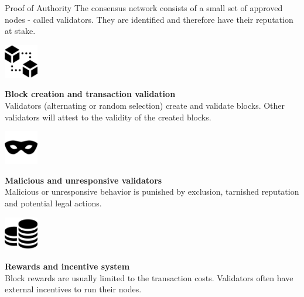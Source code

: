 \documentclass[]{beamer}
\begin{document}
	\begin{frame}{Proof of Authority}
		\small
		The consensus network consists of a \color{focus}small set of approved nodes \color{black} - called validators. They are identified and therefore have their reputation at stake.
		
		\pause
		\vspace{1.5 em}
		\begin{minipage}{0.2\textwidth}
			\begin{center}
				\includegraphics[height=4em]{../assets/images/blocks}
			\end{center}
		\end{minipage}
		\begin{minipage}{0.7\textwidth}
			\textbf{Block creation and transaction validation} \\
			Validators (alternating or random selection) create and validate blocks. Other validators will attest to the validity of the created blocks.
		\end{minipage}
		
		\pause
		\vspace{1.5 em}
		\begin{minipage}{0.2\textwidth}
			\begin{center}
				\includegraphics[height=4em]{../assets/images/mask}
			\end{center}
		\end{minipage}
		\begin{minipage}{0.7\textwidth}
			\textbf{Malicious and unresponsive validators} \\
			Malicious or unresponsive behavior is punished by exclusion, tarnished reputation and potential legal actions.
		\end{minipage}
		
		\pause
		\vspace{1.5 em}
		\begin{minipage}{0.2\textwidth}
			\begin{center}
				\includegraphics[height=4em]{../assets/images/coin-stack}
			\end{center}
		\end{minipage}
		\begin{minipage}{0.7\textwidth}
			\textbf{Rewards and incentive system} \\
			Block rewards are usually limited to the transaction costs. Validators often have external incentives to run their nodes.
		\end{minipage}
	\end{frame}
	
\end{document}
